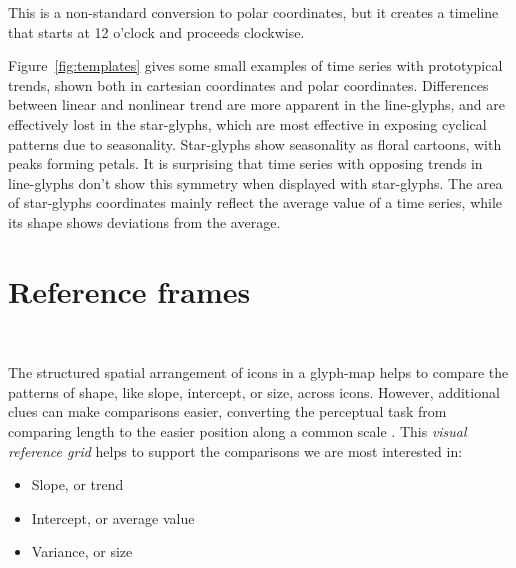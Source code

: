 \documentclass[oneside]{article}
\begin{document}
\noindent This is a non-standard conversion to polar coordinates, but it creates a timeline that starts at 12 o'clock and proceeds clockwise.

%
% 
% 
%     
%   

Figure~\ref{fig:templates} gives some small examples of time series with prototypical trends, shown both in cartesian coordinates and polar coordinates. Differences between linear and nonlinear trend are more apparent in the line-glyphs, and are effectively lost in the star-glyphs, which are most effective in exposing cyclical patterns due to seasonality. Star-glyphs show seasonality as floral cartoons, with peaks forming petals. It is surprising that time series with opposing trends in line-glyphs don't show this symmetry when displayed with star-glyphs. The area of star-glyphs coordinates mainly reflect the average value of a time series, while its shape shows deviations from the average.

\section{Reference frames}~\label{sec:reference}

The structured spatial arrangement of icons in a glyph-map helps to compare the patterns of shape, like slope, intercept, or size, across icons. However, additional clues can make comparisons easier, converting the perceptual task from comparing length to the easier position along a common scale \citep{cleveland:1984}. This \emph{visual reference grid} \citep{cleveland:1993a} helps to support the comparisons we are most interested in:

\begin{itemize} \itemsep 0in
\item Slope, or trend
\item Intercept, or average value
\item Variance, or size
\end{itemize}
\end{document}
